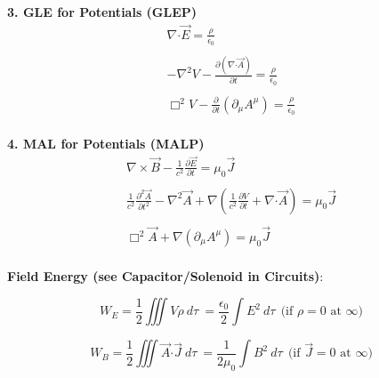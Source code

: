 \documentclass[12pt]{article}
\newcommand*{\dotP}{\boldsymbol \cdot}		%
\begin{document}
\hfill \break \newline
\begin{minipage}[t]{0.5\textwidth}
\textbf{3. GLE for Potentials (GLEP)}
\begin{gather*}
	\nabla \dotP \vec{E} = \frac{\rho}{\epsilon_0} \\ \\
	- \nabla^2 V - \frac{\partial (\nabla \dotP \vec{A})}{\partial t} = \frac{\rho}{\epsilon_0} \\ \\
	\boxed{ \Box^2 V - \frac{\partial}{\partial t} ( \partial_\mu A^\mu ) = \frac{\rho}{\epsilon_0} }\\
\end{gather*}
\end{minipage} 
\hspace{0\textwidth}
\begin{minipage}[t]{0.5\textwidth}
\textbf{4. MAL for Potentials (MALP)}
\begin{gather*}
	\nabla \times \vec{B} - \frac{1}{c^2} \frac{\partial \vec{E}}{\partial t} = \mu_0 \vec{J} \\ \\
	\frac{1}{c^2} \frac{\partial^2 \vec{A}}{\partial t^2} - \nabla^2 \vec{A} 
		+ \nabla \left ( \frac{1}{c^2} \frac{\partial V}{\partial t} + \nabla \dotP \vec{A} \right )
		= \mu_0 \vec{J} \\ \\
	\boxed{ \Box^2 \vec{A} + \nabla ( \partial_\mu A^\mu )
		= \mu_0 \vec{J} } \\
\end{gather*} 
\end{minipage} 

\vspace{15pt} \noindent
\textbf{Field Energy (see Capacitor/Solenoid in Circuits)}:\\[10pt]
\begin{minipage}{.5\textwidth}
	\[ \boxed{W_E = \frac{1}{2} \iiint V \rho \ d\tau} 
		\ = \frac{\epsilon_0}{2} \int E^2 \ d\tau 
		\ \ \text{(if \(\rho=0\) at \(\infty\))} \]
\end{minipage}
\begin{minipage}{.5\textwidth}
	\[ \boxed{ W_B = \frac{1}{2} \iiint \vec{A} \dotP \vec{J} \ d\tau }
		\ = \frac{1}{2 \mu_0} \int B^2 \ d\tau 
		\ \ \text{(if \(\vec{J}=0\) at \(\infty\))} \]
\end{minipage}
\newpage
\end{document}

